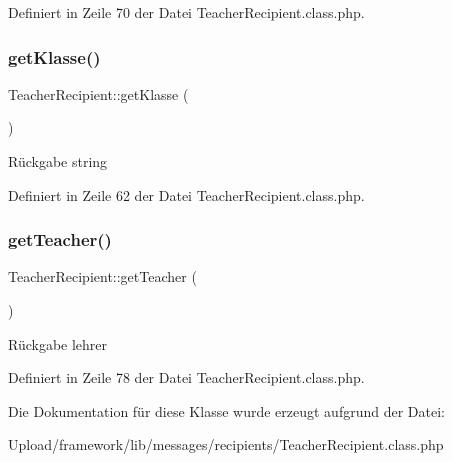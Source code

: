 Definiert in Zeile 70 der Datei Teacher\+Recipient.\+class.\+php.

\mbox{\label{class_teacher_recipient_a3dc7bf504e6df3b181cc483b92203a9e}} 
\subsubsection{\texorpdfstring{get\+Klasse()}{getKlasse()}}
{\footnotesize\ttfamily Teacher\+Recipient\+::get\+Klasse (\begin{DoxyParamCaption}{ }\end{DoxyParamCaption})}

\begin{DoxyReturn}{Rückgabe}
string 
\end{DoxyReturn}


Definiert in Zeile 62 der Datei Teacher\+Recipient.\+class.\+php.

\mbox{\label{class_teacher_recipient_a55d2bb119c0c9b33d71abad8b02a6557}} 
\subsubsection{\texorpdfstring{get\+Teacher()}{getTeacher()}}
{\footnotesize\ttfamily Teacher\+Recipient\+::get\+Teacher (\begin{DoxyParamCaption}{ }\end{DoxyParamCaption})}

\begin{DoxyReturn}{Rückgabe}
lehrer 
\end{DoxyReturn}


Definiert in Zeile 78 der Datei Teacher\+Recipient.\+class.\+php.



Die Dokumentation für diese Klasse wurde erzeugt aufgrund der Datei\+:\begin{DoxyCompactItemize}
\item 
Upload/framework/lib/messages/recipients/Teacher\+Recipient.\+class.\+php\end{DoxyCompactItemize}
